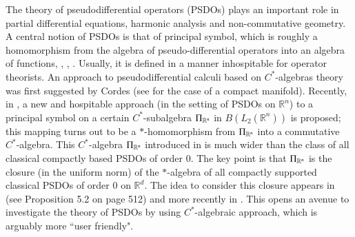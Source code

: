 \documentclass[leqno]{amsart}
\begin{document}
	The theory of pseudodifferential operators (PSDOs) plays an important role in partial differential equations, harmonic analysis and non-commutative geometry.
	A central notion of PSDOs is that of principal symbol, which is roughly a homomorphism from the algebra of pseudo-differential operators into an algebra of functions, \cite[Lemma 5.1]{Kohn-Nirenberg}, \cite[Theorem 5.5]{Joshi}, \cite[pp.54-55]{Treves-book}. Usually, it is defined in a manner inhospitable for operator theorists.  An approach to pseudodifferential calculi based on $C^*$-algebras theory was first suggested by Cordes \cite{Cordes87} (see \cite{melo05} for the case of a compact manifold). Recently, in \cite{DAO1}, a new and hospitable approach (in the setting of PSDOs on $\mathbb{R}^n$) to a principal symbol on a certain $C^{\ast}$-subalgebra $\Pi_{\mathbb{R}^{n}}$ in $B(L_2(\mathbb{R}^n))$ is proposed; this mapping turns out to be a $\ast$-homomorphism from $\Pi_{\mathbb{R}^{n}}$ into a commutative $C^{\ast}$-algebra. This $C^{\ast}$-algebra $\Pi_{\mathbb{R}^{n}}$ introduced in \cite{DAO1} is much wider than the class of all classical compactly based PSDOs of order 0. The key point is that $\Pi_{\mathbb{R}^{n}}$ is the closure (in the uniform norm) of the $\ast$-algebra of all compactly supported classical PSDOs of order $0$ on $\mathbb{R}^d$. The idea to consider this closure appears in \cite{AS1986-1} (see Proposition 5.2 on page 512) and more recently in \cite{melo05}. This opens an avenue to investigate the theory of PSDOs by using $C^{\ast}$-algebraic approach, which is arguably more ``user friendly". 
	
	
	
\end{document}
